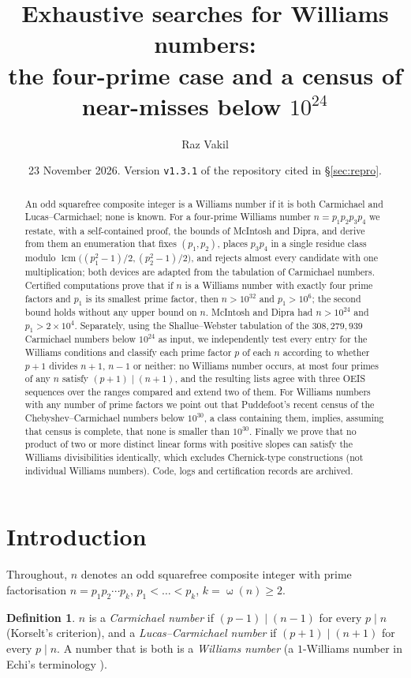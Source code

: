 \documentclass[11pt]{amsart}
\title[Exhaustive searches for Williams numbers]{Exhaustive searches for Williams numbers:\\ the four-prime case and a census of near-misses below $10^{24}$}
\author{Raz Vakil}
\date{23 November 2026. Version \texttt{v1.3.1} of the repository cited in \S\ref{sec:repro}.}
\theoremstyle{definition}
\newtheorem{definition}[theorem]{Definition}
\theoremstyle{remark}
\providecommand{\lcm}{\operatorname{lcm}}
\DeclareMathOperator{\omg}{\omega}
\begin{document}
\begin{abstract}
An odd squarefree composite integer is a Williams number if it is both Carmichael and Lucas--Carmichael; none is known. For a four-prime Williams number $n=p_1p_2p_3p_4$ we restate, with a self-contained proof, the bounds of McIntosh and Dipra, and derive from them an enumeration that fixes $(p_1,p_2)$, places $p_3p_4$ in a single residue class modulo $\lcm\bigl((p_1^2-1)/2,(p_2^2-1)/2\bigr)$, and rejects almost every candidate with one multiplication; both devices are adapted from the tabulation of Carmichael numbers. Certified computations prove that if $n$ is a Williams number with exactly four prime factors and $p_1$ is its smallest prime factor, then $n>10^{32}$ and $p_1>10^{6}$; the second bound holds without any upper bound on $n$. McIntosh and Dipra had $n>10^{24}$ and $p_1>2\times10^4$. Separately, using the Shallue--Webster tabulation of the $308{,}279{,}939$ Carmichael numbers below $10^{24}$ as input, we independently test every entry for the Williams conditions and classify each prime factor $p$ of each $n$ according to whether $p+1$ divides $n+1$, $n-1$ or neither: no Williams number occurs, at most four primes of any $n$ satisfy $(p+1)\mid(n+1)$, and the resulting lists agree with three OEIS sequences over the ranges compared and extend two of them. For Williams numbers with any number of prime factors we point out that Puddefoot's recent census of the Chebyshev--Carmichael numbers below $10^{30}$, a class containing them, implies, assuming that census is complete, that none is smaller than $10^{30}$. Finally we prove that no product of two or more distinct linear forms with positive slopes can satisfy the Williams divisibilities identically, which excludes Chernick-type constructions (not individual Williams numbers). Code, logs and certification records are archived.
\end{abstract}

\maketitle

\section{Introduction}

Throughout, $n$ denotes an odd squarefree composite integer with prime factorisation $n=p_1p_2\cdots p_k$, $p_1<\dots<p_k$, $k=\omg(n)\ge2$.

\begin{definition}
$n$ is a \emph{Carmichael number} if $(p-1)\mid(n-1)$ for every $p\mid n$ (Korselt's criterion), and a \emph{Lucas--Carmichael number} if $(p+1)\mid(n+1)$ for every $p\mid n$. A number that is both is a \emph{Williams number} (a $1$-Williams number in Echi's terminology \cite{Echi07}).
\end{definition}
\end{document}

